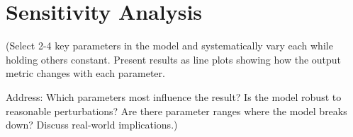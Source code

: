 \section{Sensitivity Analysis}

(Select 2-4 key parameters in the model and systematically vary each
while holding others constant. Present results as line plots showing how
the output metric changes with each parameter.

Address: Which parameters most influence the result? Is the model robust
to reasonable perturbations? Are there parameter ranges where the model
breaks down? Discuss real-world implications.)
